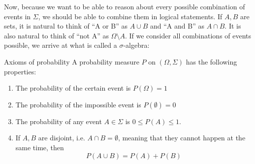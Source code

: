 \begin{frame}
{  Now, because we want to be able to reason about every possible combination of events in $\Sigma$, we should be able to combine them in logical statements. If $A, B$ are sets, it is natural to think of ``A or B'' as $A \cup B$ and ``A and B'' as $A \cap B$. It is also natural to think of ``not A'' as $\Omega \setminus A$. If we consider all combinations of events possible, we arrive at what is called a $\sigma$-algebra:
}
  \begin{block}{Axioms of probability}
    A probability measure $P$ on $(\Omega, \Sigma)$ has the following properties:
    \begin{enumerate}
    \item<2-> The probability of the certain event is $P(\Omega) = 1$
    \item<3->The probability of the impossible event is
      $P(\emptyset) = 0$
    \item<4->The probability of any event $A \in \Sigma$ is $0 \leq P(A) \leq 1$.
    \item<5-> If $A, B$ are disjoint, i.e. $A \cap B = \emptyset$, meaning
      that they cannot happen at the same time, then
      \[
      P(A \cup B) = P(A) + P(B)
      \]
    \end{enumerate}
  \end{block}
\end{frame}

